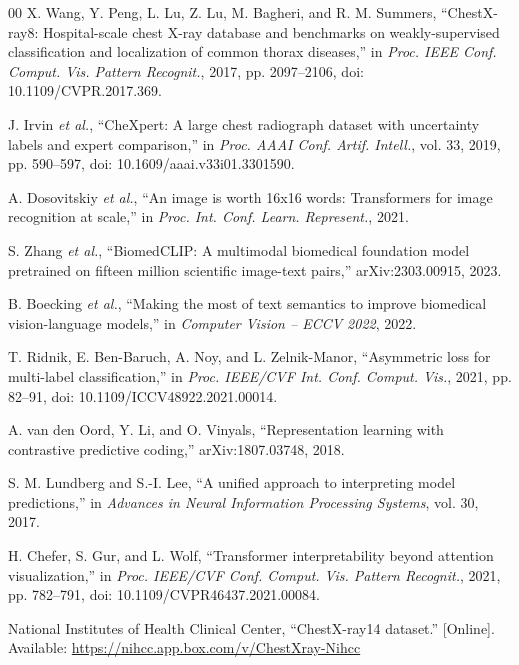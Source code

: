 \documentclass[conference]{IEEEtran}
\begin{document}
\begin{thebibliography}{00}
X. Wang, Y. Peng, L. Lu, Z. Lu, M. Bagheri, and R. M. Summers, ``ChestX-ray8: Hospital-scale chest X-ray database and benchmarks on weakly-supervised classification and localization of common thorax diseases,'' in \emph{Proc. IEEE Conf. Comput. Vis. Pattern Recognit.}, 2017, pp. 2097--2106, doi: 10.1109/CVPR.2017.369.

J. Irvin \emph{et al.}, ``CheXpert: A large chest radiograph dataset with uncertainty labels and expert comparison,'' in \emph{Proc. AAAI Conf. Artif. Intell.}, vol. 33, 2019, pp. 590--597, doi: 10.1609/aaai.v33i01.3301590.

A. Dosovitskiy \emph{et al.}, ``An image is worth 16x16 words: Transformers for image recognition at scale,'' in \emph{Proc. Int. Conf. Learn. Represent.}, 2021.

S. Zhang \emph{et al.}, ``BiomedCLIP: A multimodal biomedical foundation model pretrained on fifteen million scientific image-text pairs,'' arXiv:2303.00915, 2023.

B. Boecking \emph{et al.}, ``Making the most of text semantics to improve biomedical vision-language models,'' in \emph{Computer Vision -- ECCV 2022}, 2022.

T. Ridnik, E. Ben-Baruch, A. Noy, and L. Zelnik-Manor, ``Asymmetric loss for multi-label classification,'' in \emph{Proc. IEEE/CVF Int. Conf. Comput. Vis.}, 2021, pp. 82--91, doi: 10.1109/ICCV48922.2021.00014.

A. van den Oord, Y. Li, and O. Vinyals, ``Representation learning with contrastive predictive coding,'' arXiv:1807.03748, 2018.

S. M. Lundberg and S.-I. Lee, ``A unified approach to interpreting model predictions,'' in \emph{Advances in Neural Information Processing Systems}, vol. 30, 2017.

H. Chefer, S. Gur, and L. Wolf, ``Transformer interpretability beyond attention visualization,'' in \emph{Proc. IEEE/CVF Conf. Comput. Vis. Pattern Recognit.}, 2021, pp. 782--791, doi: 10.1109/CVPR46437.2021.00084.

National Institutes of Health Clinical Center, ``ChestX-ray14 dataset.'' [Online]. Available: \url{https://nihcc.app.box.com/v/ChestXray-Nihcc}
\end{thebibliography}
\end{document}

